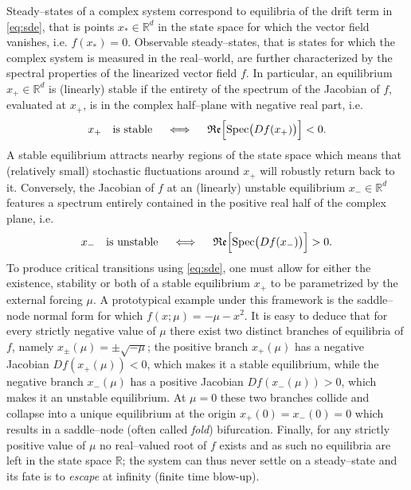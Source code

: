 Steady--states of a complex system correspond to equilibria of the drift term in \eqref{eq:sde}, that is points $x_*\in\mathbb{R}^{d}$ in the state space for which the vector field vanishes, i.e. $f(x_*)=0$.
Observable steady--states, that is states for which the complex system is measured in the real--world, are further characterized by the spectral properties of the linearized vector field $f$.
In particular, an equilibrium $x_+\in \mathbb{R}^{d}$ is (linearly) stable if the entirety of the spectrum of the Jacobian of $f$, evaluated at $x_+$, is in the complex half--plane with negative real part, i.e.
%
\begin{equation}\label{eq:stable_equilibrium}
  x_+\quad \text{is stable}\quad \iff \quad \mathfrak{Re}\Bigl[\operatorname{Spec}\bigl(Df(x_+)\bigr)\Bigr] < 0.
\end{equation}
%
A stable equilibrium attracts nearby regions of the state space which means that (relatively small) stochastic fluctuations around $x_+$ will robustly return back to it.
Conversely, the Jacobian of $f$ at an (linearly) unstable equilibrium $x_-\in\mathbb{R}^{d}$ features a spectrum entirely contained in the positive real half of the complex plane, i.e.
%
\begin{equation}\label{eq:unstable_equilibrium}
  x_-\quad \text{is unstable}\quad \iff \quad \mathfrak{Re}\Bigl[\operatorname{Spec}\bigl(Df(x_-)\bigr)\Bigr] > 0.
\end{equation}
%
To produce critical transitions using \eqref{eq:sde}, one must allow for either the existence, stability or both of a stable equilibrium $x_+$ to be parametrized by the external forcing $\mu$.
A prototypical example under this framework is the saddle--node normal form for which $f(x;\mu) = -\mu - x^2$.
It is easy to deduce that for every strictly negative value of $\mu$ there exist two distinct branches of equilibria of $f$, namely $x_{\pm}(\mu) = \pm\sqrt{-\mu}$; the positive branch $x_+(\mu)$ has a negative Jacobian $Df(x_+(\mu))<0$, which makes it a stable equilibrium, while the negative branch $x_-(\mu)$ has a positive Jacobian $Df(x_-(\mu))>0$, which makes it an unstable equilibrium.
At $\mu=0$ these two branches collide and collapse into a unique equilibrium at the origin $x_+(0)=x_-(0)=0$ which results in a saddle--node (often called \emph{fold}) bifurcation. 
Finally, for any strictly positive value of $\mu$ no real--valued root of $f$ exists and as such no equilibria are left in the state space $\mathbb{R}$; the system can thus never settle on a steady--state and its fate is to \emph{escape} at infinity (finite time blow-up).

